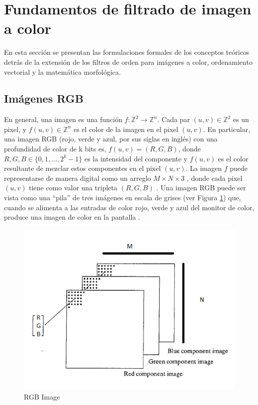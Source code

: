 \section{Fundamentos de filtrado de imagen a color}
\label{Teo}

En esta sección se presentan las formulaciones formales de los conceptos teóricos detrás de la extensión de los filtros de orden para imágenes a color, ordenamiento vectorial y la matemática morfológica. 

\subsection{Im\'agenes RGB}

En general, una imagen es una funci\'on $f:\mathbb{Z}^2 \rightarrow \mathbb{Z}^n$.  Cada par $(u,v) \in \mathbb{Z}^2$ es un pixel, y $f(u,v) \in \mathbb Z^n $ es el color de la imagen en el pixel $(u,v)$. En particular, una imagen RGB (rojo, verde y azul, por sus siglas en inglés) con una profundidad de color de k bits es, $f(u,v) = (R,G,B)$, donde $R,G,B \in \{0,1,...,2^k-1\}$ es la intensidad del componente y $f(u,v)$ es el color resultante de mezclar estos componentes en el pixel $(u,v)$. %
La imagen $f$ puede representarse de manera digital como un arreglo $M \times N \times 3$ , donde cada pixel $(u,v)$ tiene como valor una tripleta $(R,G,B)$ \cite{gonzales2004digital}. Una imagen RGB puede ser vista como una ``pila'' de tres im\'agenes en escala de grises (ver Figura \ref{fig:ImagenRGB}) que, cuando se alimenta a las entradas de color rojo, verde y azul del monitor de color, produce una imagen de color en la pantalla \cite{gonzales2004digital}.


\begin{figure}[htbp]
	\centering
		\includegraphics[scale=0.65]{fig/ImagenRGB.png}
	\caption{RGB Image}
	\label{fig:ImagenRGB}
\end{figure}

